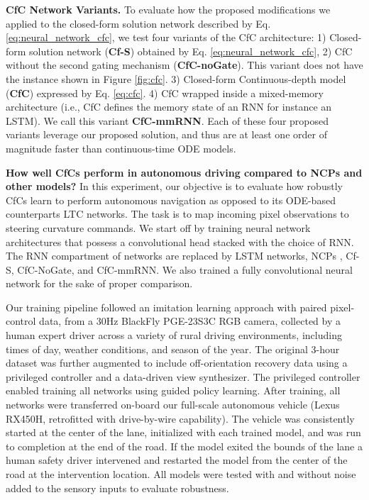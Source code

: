 \documentclass[12pt]{article}
\begin{document}
\noindent \textbf{CfC Network Variants.} To evaluate how the proposed modifications we applied to the closed-form solution network described by Eq. \ref{eq:neural_network_cfc}, we test four variants of the CfC architecture: 1) Closed-form solution network (\textbf{Cf-S}) obtained by Eq. \ref{eq:neural_network_cfc}, 2) CfC without the second gating mechanism (\textbf{CfC-noGate}). This variant does not have the  instance shown in Figure \ref{fig:cfc}. 3) Closed-form Continuous-depth model (\textbf{CfC}) expressed by Eq. \ref{eq:cfc}. 4) CfC wrapped inside a mixed-memory architecture (i.e., CfC defines the memory state of an RNN for instance an LSTM). We call this variant \textbf{CfC-mmRNN}. Each of these four proposed variants leverage our proposed solution, and thus are at least one order of magnitude faster than continuous-time ODE models. 


\noindent \textbf{How well CfCs perform in autonomous driving compared to NCPs and other models?} In this experiment, our objective is to evaluate how robustly CfCs learn to perform autonomous navigation as opposed to its ODE-based counterparts LTC networks. The task is to map incoming pixel observations to steering curvature commands. We start off by training neural network architectures that possess a convolutional head stacked with the choice of RNN. The RNN compartment of networks are replaced by LSTM networks, NCPs \cite{lechner2020neural}, Cf-S, CfC-NoGate, and CfC-mmRNN. We also trained a fully convolutional neural network for the sake of proper comparison. 

Our training pipeline followed an imitation learning approach with paired pixel-control data, from a 30Hz BlackFly PGE-23S3C RGB camera, collected by a human expert driver across a variety of rural driving environments, including times of day, weather conditions, and season of the year. The original 3-hour dataset was further augmented to include off-orientation recovery data using a privileged controller\cite{amini2021vista} and a data-driven view synthesizer\cite{amini2020learning}. The privileged controller enabled training all networks using guided policy learning\cite{levine2013guided}. After training, all networks were transferred on-board our full-scale autonomous vehicle (Lexus RX450H, retrofitted with drive-by-wire capability). The vehicle was consistently started at the center of the lane, initialized with each trained model, and was run to completion at the end of the road. If the model exited the bounds of the lane a human safety driver intervened and restarted the model from the center of the road at the intervention location. All models were tested with and without noise added to the sensory inputs to evaluate robustness. 
\end{document}
